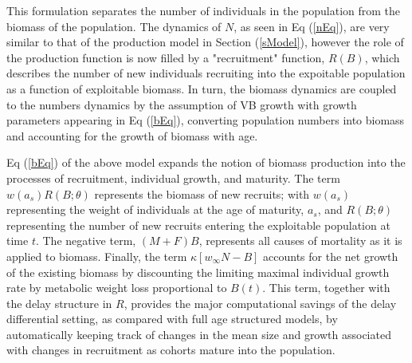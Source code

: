 %
This formulation separates the number of individuals in the population from the
biomass of the population. The dynamics of $N$, as seen in Eq (\ref{nEq}), are
very similar to that of the production model in Section (\ref{sModel}), 
however the role of the production function is now filled by a "recruitment"
function, $R(B)$, which describes the number of new individuals recruiting into the
expoitable population as a function of exploitable biomass. In turn, the biomass
dynamics are coupled to the numbers dynamics by the assumption of VB growth with
growth parameters appearing in Eq (\ref{bEq}), converting population numbers
into biomass and accounting for the growth of biomass with age.

%
Eq (\ref{bEq}) of the above model expands the notion of biomass production into the
processes of recruitment, individual growth, and maturity. The term $w(a_s)R(B;\theta)$
represents the biomass of new recruits; with $w(a_s)$ representing the weight of individuals
at the age of maturity, $a_s$, and $R(B;\theta)$ representing the number of new recruits
entering the exploitable population at time $t$. The negative term, $(M+F)B$, represents all
causes of mortality as it is applied to biomass. Finally, the term $\kappa \left[w_\infty N-B\right]$
accounts for the net growth of the existing biomass by discounting the limiting maximal individual
growth rate by metabolic weight loss proportional to $B(t)$. This term, together with the delay
structure in $R$, provides the major computational savings of the delay differential setting, as
compared with full age structured models, by automatically keeping track of changes in the mean
size and growth associated with changes in recruitment as cohorts mature into the population.

